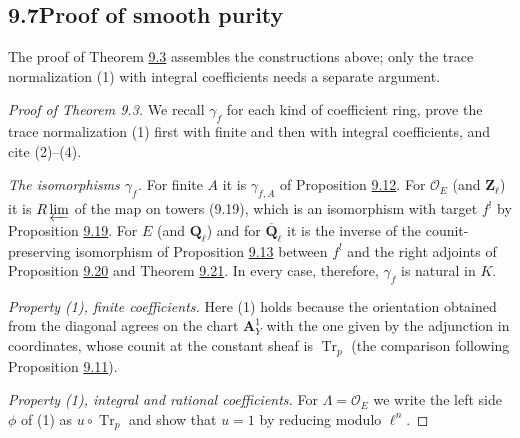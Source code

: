 \documentclass[11pt]{article}
\begin{document}
\subsection*{\texorpdfstring{9.7\quad Proof of smooth purity}{9.7 Proof of smooth purity}}
\label{bp92}%
\label{bp93}%
The proof of Theorem \hyperref[bp9]{9.3} assembles the constructions above; only the trace normalization (1) with integral coefficients needs a separate argument.

\begin{proof}[{Proof of Theorem 9.3}]\label{bp94}%
We recall \(\gamma_f\) for each kind of coefficient ring, prove the trace normalization (1) first with finite and then with integral coefficients, and cite (2)–(4).

\emph{The isomorphisms \(\gamma_f\).} For finite \(A\) it is \(\gamma_{f,A}\) of Proposition \hyperref[bp37]{9.12}. For \(\mathcal O_E\) (and \(\mathbf Z_\ell\)) it is \(R\varprojlim\) of the map on towers (9.19), which is an isomorphism with target \(f^!\) by Proposition \hyperref[bp61]{9.19}. For \(E\) (and \(\mathbf Q_\ell\)) and for \(\overline{\mathbf Q}_\ell\) it is the inverse of the counit-preserving isomorphism of Proposition \hyperref[bp41]{9.13} between \(f^!\) and the right adjoints of Proposition \hyperref[bp66]{9.20} and Theorem \hyperref[bp69]{9.21}. In every case, therefore, \(\gamma_f\) is natural in \(K\).

\emph{Property (1), finite coefficients.} Here (1) holds because the orientation obtained from the diagonal agrees on the chart \(\mathbf A^1_Y\) with the one given by the adjunction in coordinates, whose counit at the constant sheaf is \(\operatorname{Tr}_p\) (the comparison following Proposition \hyperref[bp34]{9.11}).

\emph{Property (1), integral and rational coefficients.} For \(\Lambda=\mathcal O_E\) we write the left side \(\phi\) of (1) as \(u\circ\operatorname{Tr}_p\) and show that \(u=1\) by reducing modulo \(\ell^n\).


\end{proof}
\end{document}

